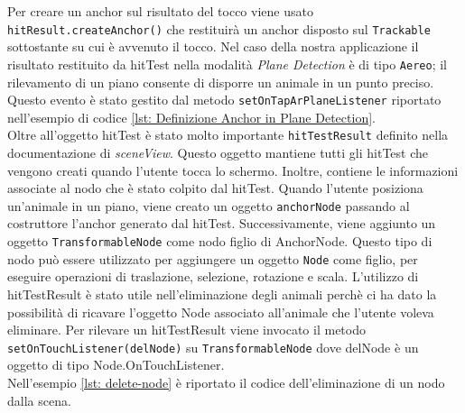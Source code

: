 \documentclass[crop=false, class=book]{standalone}
\begin{document}
	\noindent
	Per creare un anchor sul risultato del tocco viene usato \verb|hitResult.createAnchor()| che restituirà un anchor disposto sul \verb|Trackable| sottostante su cui è avvenuto il tocco.
	Nel caso della nostra applicazione il risultato restituito da hitTest nella modalità \emph{Plane Detection} è di tipo \verb|Aereo|; il rilevamento di un piano consente di disporre un animale in un punto preciso. Questo evento è stato gestito dal metodo \verb|setOnTapArPlaneListener| riportato nell'esempio di codice \vref{lst: Definizione Anchor in Plane Detection}.
	\\
	Oltre all'oggetto hitTest è stato molto importante \verb|hitTestResult| definito nella documentazione di \emph{sceneView}. Questo oggetto mantiene tutti gli hitTest che vengono creati quando l'utente tocca lo schermo. Inoltre, contiene le informazioni associate al nodo che è stato colpito dal hitTest. Quando l'utente posiziona un'animale in un piano, viene creato un oggetto \verb|anchorNode| passando al costruttore l'anchor generato dal hitTest. Successivamente, viene aggiunto un oggetto \verb|TransformableNode| come nodo figlio di AnchorNode. Questo tipo di nodo può essere utilizzato per aggiungere un oggetto \verb|Node| come figlio, per eseguire operazioni di traslazione, selezione, rotazione e scala. L'utilizzo di hitTestResult è stato utile nell'eliminazione degli animali perchè ci ha dato la possibilità di ricavare l'oggetto Node associato all'animale che l'utente voleva eliminare. Per rilevare un hitTestResult viene invocato il metodo \verb|setOnTouchListener(delNode)| su \verb|TransformableNode| dove delNode è un oggetto di tipo Node.OnTouchListener.
	\\	
	Nell'esempio \vref{lst: delete-node} è riportato il codice dell'eliminazione di un nodo dalla scena.
	
\end{document}
